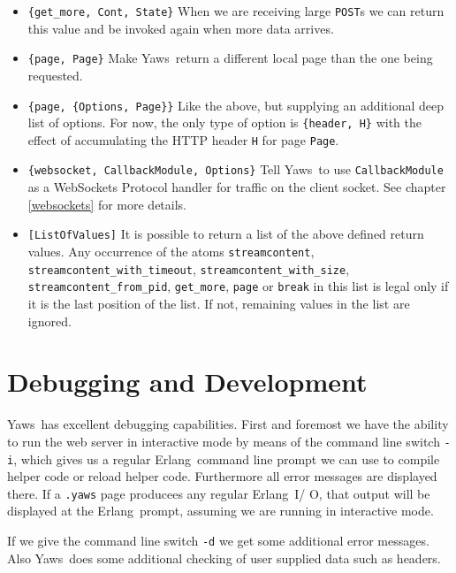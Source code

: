 \documentclass[11pt,oneside,english]{book}
\newcommand{\Erlang}            %
        {{\sc Erlang}}
\newcommand{\Yaws}            %
        {{\sc Yaws}}
\begin{document}
\begin{itemize}
\item \verb+{get_more, Cont, State}+ When we are receiving large
  \verb+POST+s we can return this value and be invoked again when more
  data arrives.

\item \verb+{page, Page}+ Make \Yaws\ return a different local page
  than the one being requested.

\item \verb+{page, {Options, Page}}+ Like the above, but supplying an
  additional deep list of options.  For now, the only type of option
  is \verb+{header, H}+ with the effect of accumulating the HTTP
  header \verb+H+ for page \verb+Page+.

\item \verb+{websocket, CallbackModule, Options}+ Tell \Yaws\  to use
  \verb+CallbackModule+ as a WebSockets Protocol handler for traffic
  on the client socket. See chapter \ref{websockets} for more details.

\item \verb+[ListOfValues]+ It is possible to return a list of the above defined
  return values. Any occurrence of the atoms \verb+streamcontent+,
  \verb+streamcontent_with_timeout+,
  \verb+streamcontent_with_size+,\\
  \verb+streamcontent_from_pid+, \verb+get_more+, \verb+page+ or \verb+break+ in
  this list is legal only if it is the last position of the list. If not,
  remaining values in the list are ignored.

\end{itemize}



\chapter{Debugging and Development}

\Yaws\ has excellent debugging capabilities. First and foremost we
have the ability to run the web server in interactive mode by means of
the command line switch \verb+-i+, which gives us a regular
\Erlang\ command line prompt we can use to compile helper code or
reload helper code. Furthermore all error messages are displayed
there.  If a \verb+.yaws+ page producees any regular \Erlang\ I\slash
O, that output will be displayed at the \Erlang\ prompt, assuming we
are running in interactive mode.

If we give the command line switch \verb+-d+ we get some additional
error messages. Also \Yaws\ does some additional checking of user
supplied data such as headers.
\end{document}
